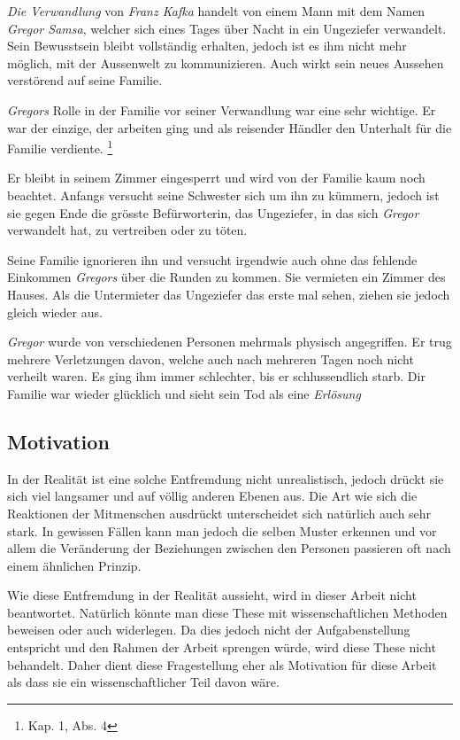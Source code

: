 \documentclass[12pt,a4paper,twoside,titlepage]{article}
\begin{document}
	\textit{Die Verwandlung} von \textit{Franz Kafka} handelt von einem Mann mit dem Namen \textit{Gregor Samsa}, welcher sich eines Tages über Nacht in ein Ungeziefer verwandelt. Sein Bewusstsein bleibt vollständig erhalten, jedoch ist es ihm nicht mehr möglich, mit der Aussenwelt zu kommunizieren. Auch wirkt sein neues Aussehen verstörend auf seine Familie.
	
	\textit{Gregors} Rolle in der Familie vor seiner Verwandlung war eine sehr wichtige. Er war der einzige, der arbeiten ging und als reisender Händler den Unterhalt für die Familie verdiente. \footnote{\cite{verwandlung} Kap. 1, Abs. 4}
	
	Er bleibt in seinem Zimmer eingesperrt und wird von der Familie kaum noch beachtet. Anfangs versucht seine Schwester sich um ihn zu kümmern, jedoch ist sie gegen Ende die grösste Befürworterin, das Ungeziefer, in das sich \textit{Gregor} verwandelt hat, zu vertreiben oder zu töten.
	
	Seine Familie ignorieren ihn und versucht irgendwie auch ohne das fehlende Einkommen \textit{Gregors} über die Runden zu kommen. Sie vermieten ein Zimmer des Hauses. Als die Untermieter das Ungeziefer das erste mal sehen, ziehen sie jedoch gleich wieder aus.
	
	\textit{Gregor} wurde von verschiedenen Personen mehrmals physisch angegriffen. Er trug mehrere Verletzungen davon, welche auch nach mehreren Tagen noch nicht verheilt waren. Es ging ihm immer schlechter, bis er schlussendlich starb. Dir Familie war wieder glücklich und sieht sein Tod als eine \textit{Erlösung}
	
	\subsection{Motivation}
	
	In der Realität ist eine solche Entfremdung nicht unrealistisch, jedoch drückt sie sich viel langsamer und auf völlig anderen Ebenen aus. Die Art wie sich die Reaktionen der Mitmenschen ausdrückt unterscheidet sich natürlich auch sehr stark. In gewissen Fällen kann man jedoch die selben Muster erkennen und vor allem die Veränderung der Beziehungen zwischen den Personen passieren oft nach einem ähnlichen Prinzip. 
	
	Wie diese Entfremdung in der Realität aussieht, wird in dieser Arbeit nicht beantwortet. Natürlich könnte man diese These mit wissenschaftlichen Methoden beweisen oder auch widerlegen. Da dies jedoch nicht der Aufgabenstellung entspricht und den Rahmen der Arbeit sprengen würde, wird diese These nicht behandelt. Daher dient diese Fragestellung eher als Motivation für diese Arbeit als dass sie ein wissenschaftlicher Teil davon wäre.
	
\end{document}
